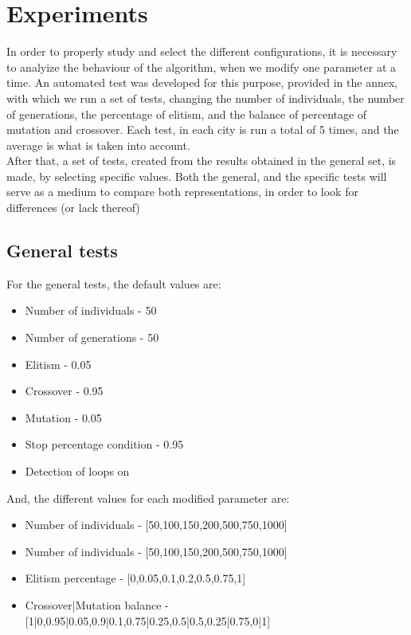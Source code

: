 \section{Experiments}

In order to properly study and select the different configurations, it is
necessary to analyize the behaviour of the algorithm, when we modify one
parameter at a
time. An automated test was developed for this purpose, provided in the annex,
with which we run a set of tests, changing the number of individuals, the number of
generations, the percentage of elitism, and the balance of percentage of
mutation and crossover. Each test, in each city is run a total of 5 times,
and the average is what is taken into account. \\
After that, a set of tests, created from the results obtained in the general
set, is made, by selecting specific values. Both the general, and the specific
tests will serve as a medium to compare both representations, in order to look
for differences (or lack thereof)
\\
\subsection{General tests}
For the general tests, the default values are:

\begin{itemize}
  \item Number of individuals - 50
  \item Number of generations - 50
  \item Elitism - 0.05
  \item Crossover - 0.95
  \item Mutation - 0.05
  \item Stop percentage condition - 0.95
  \item Detection of loops on
\end{itemize}

And, the different values for each modified parameter are:

\begin{itemize}
  \item Number of individuals - [50,100,150,200,500,750,1000]
  \item Number of individuals - [50,100,150,200,500,750,1000]
  \item Elitism percentage - [0,0.05,0.1,0.2,0.5,0.75,1]
  \item Crossover|Mutation balance - [1|0,0.95|0.05,0.9|0.1,0.75|0.25,0.5|0.5,0.25|0.75,0|1]
 \end{itemize}

